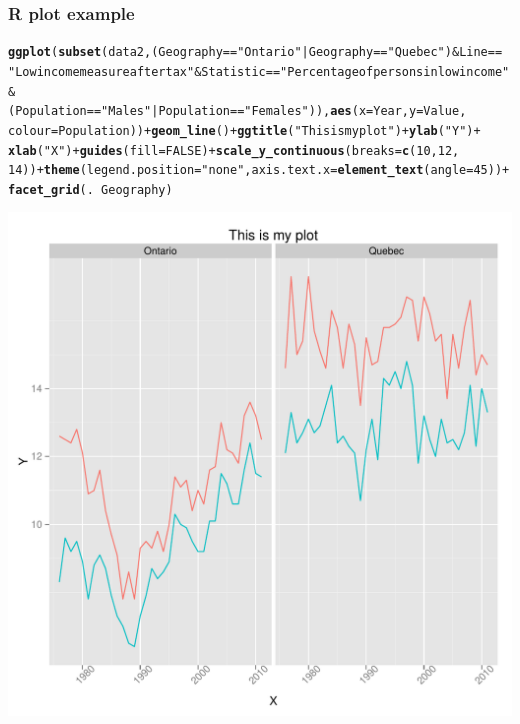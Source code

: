 \documentclass[nogin]{beamer}\usepackage[]{graphicx}\usepackage[]{color}
\makeatletter
\def\maxwidth{ %
  \ifdim\Gin@nat@width>\linewidth
    \linewidth
  \else
    \Gin@nat@width
  \fi
}
\newcommand{\hlnum}[1]{\textcolor[rgb]{0.686,0.059,0.569}{#1}}%
\newcommand{\hlstr}[1]{\textcolor[rgb]{0.192,0.494,0.8}{#1}}%
\newcommand{\hlopt}[1]{\textcolor[rgb]{0,0,0}{#1}}%
\newcommand{\hlstd}[1]{\textcolor[rgb]{0.345,0.345,0.345}{#1}}%
\newcommand{\hlkwc}[1]{\textcolor[rgb]{0.333,0.667,0.333}{#1}}%
\newcommand{\hlkwd}[1]{\textcolor[rgb]{0.737,0.353,0.396}{\textbf{#1}}}%
\newenvironment{kframe}{%
 \def\at@end@of@kframe{}%
 \ifinner\ifhmode%
  \def\at@end@of@kframe{\end{minipage}}%
  \begin{minipage}{\columnwidth}%
 \fi\fi%
 \def\FrameCommand##1{\hskip\@totalleftmargin \hskip-\fboxsep
 \colorbox{shadecolor}{##1}\hskip-\fboxsep
     \hskip-\linewidth \hskip-\@totalleftmargin \hskip\columnwidth}%
 \MakeFramed {\advance\hsize-\width
   \@totalleftmargin\z@ \linewidth\hsize
   \@setminipage}}%
 {\par\unskip\endMakeFramed%
 \at@end@of@kframe}
\newenvironment{knitrout}{}{} %
\makeatother
\begin{document}
\begin{frame}[fragile]
\frametitle{R plot example}
\begin{knitrout}
\color{fgcolor}\begin{kframe}
\begin{alltt}
\hlkwd{ggplot}\hlstd{(}\hlkwd{subset}\hlstd{(data2, (Geography} \hlopt{==} \hlstr{"Ontario"} \hlopt{|} \hlstd{Geography} \hlopt{==} \hlstr{"Quebec"}\hlstd{)} \hlopt{&} \hlstd{Line} \hlopt{==}
    \hlstr{"Low income measure after tax"} \hlopt{&} \hlstd{Statistic} \hlopt{==} \hlstr{"Percentage of persons in low income"} \hlopt{&}
    \hlstd{(Population} \hlopt{==} \hlstr{"Males"} \hlopt{|} \hlstd{Population} \hlopt{==} \hlstr{"Females"}\hlstd{)),} \hlkwd{aes}\hlstd{(}\hlkwc{x} \hlstd{= Year,} \hlkwc{y} \hlstd{= Value,}
    \hlkwc{colour} \hlstd{= Population))} \hlopt{+} \hlkwd{geom_line}\hlstd{()} \hlopt{+} \hlkwd{ggtitle}\hlstd{(}\hlstr{"This is my plot"}\hlstd{)} \hlopt{+} \hlkwd{ylab}\hlstd{(}\hlstr{"Y"}\hlstd{)} \hlopt{+}
    \hlkwd{xlab}\hlstd{(}\hlstr{"X"}\hlstd{)} \hlopt{+} \hlkwd{guides}\hlstd{(}\hlkwc{fill} \hlstd{=} \hlnum{FALSE}\hlstd{)} \hlopt{+} \hlkwd{scale_y_continuous}\hlstd{(}\hlkwc{breaks} \hlstd{=} \hlkwd{c}\hlstd{(}\hlnum{10}\hlstd{,} \hlnum{12}\hlstd{,}
    \hlnum{14}\hlstd{))} \hlopt{+} \hlkwd{theme}\hlstd{(}\hlkwc{legend.position} \hlstd{=} \hlstr{"none"}\hlstd{,} \hlkwc{axis.text.x} \hlstd{=} \hlkwd{element_text}\hlstd{(}\hlkwc{angle} \hlstd{=} \hlnum{45}\hlstd{))} \hlopt{+}
    \hlkwd{facet_grid}\hlstd{(.} \hlopt{~} \hlstd{Geography)}
\end{alltt}
\end{kframe}
\includegraphics[width=\maxwidth]{figure/unnamed-chunk-11} 

\end{knitrout}

\end{frame}
\end{document}
